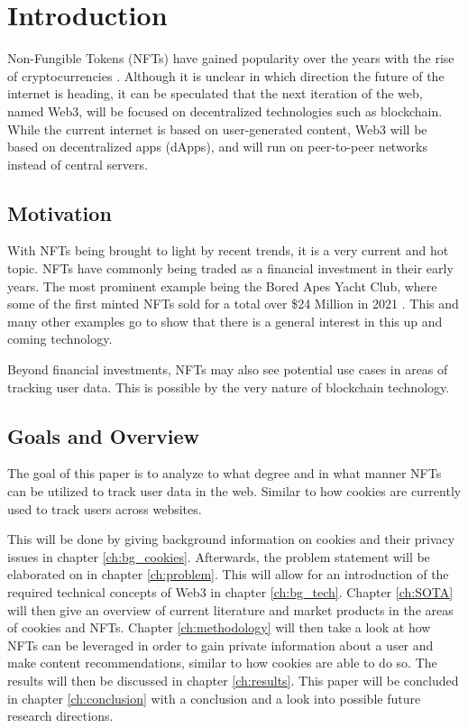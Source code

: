 \chapter{Introduction}
\label{ch:intro}

Non-Fungible Tokens (NFTs) have gained popularity over the years with the rise of cryptocurrencies \cite{bayc}. Although it is unclear in which direction the future of the internet is heading, it can be speculated that the next iteration of the web, named Web3, will be focused on decentralized technologies such as blockchain. While the current internet is based on user-generated content, Web3 will be based on decentralized apps (dApps), and will run on peer-to-peer networks instead of central servers.

%
%
\section{Motivation}
\label{sec:intro:motivation}
With NFTs being brought to light by recent trends, it is a very current and hot topic. NFTs have commonly being traded as a financial investment in their early years. The most prominent example being the Bored Apes Yacht Club, where some of the first minted NFTs sold for a total over \$24 Million in 2021 \cite{bayc}. This and many other examples go to show that there is a general interest in this up and coming technology.

Beyond financial investments, NFTs may also see potential use cases in areas of tracking user data. This is possible by the very nature of blockchain technology.


%
%
\section{Goals and Overview}
\label{sec:intro:overview}
The goal of this paper is to analyze to what degree and in what manner NFTs can be utilized to track user data in the web. Similar to how cookies are currently used to track users across websites.

This will be done by giving background information on cookies and their privacy issues in chapter \ref{ch:bg_cookies}. Afterwards, the problem statement will be elaborated on in chapter \ref{ch:problem}. This will allow for an introduction of the required technical concepts of Web3 in chapter \ref{ch:bg_tech}. Chapter \ref{ch:SOTA} will then give an overview of current literature and market products in the areas of cookies and NFTs. Chapter \ref{ch:methodology} will then take a look at how NFTs can be leveraged in order to gain private information about a user and make content recommendations, similar to how cookies are able to do so. The results will then be discussed in chapter \ref{ch:results}. This paper will be concluded in chapter \ref{ch:conclusion} with a conclusion and a look into possible future research directions.